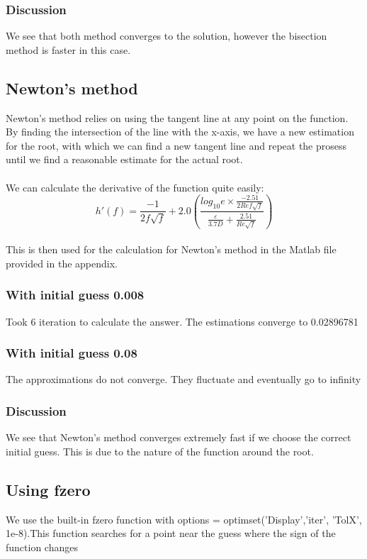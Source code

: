 \documentclass{book}
\begin{document}
    \subsubsection{Discussion}
    We see that both method converges to the solution, however the bisection method is faster in this case.
    \subsection{Newton's method}
	Newton's method relies on using the tangent line at any point on the function. By finding the intersection of the line with the x-axis, we have a new estimation for the root, with which we can find a new tangent line and repeat the prosess until we find a reasonable estimate for the actual root.    \\
	\\
    We can calculate the derivative of the function quite easily: \\
    \[ h'(f) = \frac{-1}{2 f \sqrt{f}} + 2.0 \left(\frac{log_{10} e \times \frac{-2.51}{2 \textit{Re} f \sqrt{f}}}{\frac{\varepsilon}{3.7D} + \frac{2.51}{\textit{Re}\sqrt{f}}}\right) \]\\
    This is then used for the calculation for Newton's method in the Matlab file provided in the appendix.
    \subsubsection{With initial guess 0.008}
    Took 6 iteration to calculate the answer. The estimations converge to 0.02896781 
    \subsubsection{With initial guess 0.08}
    The approximations do not converge. They fluctuate and eventually go to infinity
    \subsubsection{Discussion}
    We see that Newton's method converges extremely fast if we choose the correct initial guess. This is due to the nature of the function around the root.
    \subsection{Using fzero}
    We use the built-in fzero function with options = optimset('Display','iter', 'TolX', 1e-8).This function searches for a point near the guess where the sign of the function changes
\end{document}
